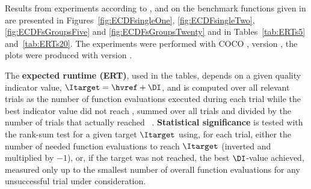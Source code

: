 \documentclass[sigconf]{acmart}
\begin{document}
Results from experiments according to \cite{hansen2016exp},
\cite{hansen2016perfass} and \cite{biobj2016perfass} on the benchmark
functions given in \cite{biobj2016func} are presented in
Figures~\ref{fig:ECDFsingleOne}, \ref{fig:ECDFsingleTwo}, \ref{fig:ECDFsGroupsFive} and
\ref{fig:ECDFsGroupsTwenty} and in Tables~\ref{tab:ERTs5} and~\ref{tab:ERTs20}.
The experiments were performed with COCO \cite{hansen2020cocoplat}, version
\change{\version}, the plots were produced with version \change{\version}.

The \textbf{expected runtime (ERT)}, used in the %
tables,
depends on a given quality indicator value, $\Itarget=\hvref+\DI$, and is
computed over all relevant trials as the number of function
evaluations executed during each trial while the best indicator value
did not reach \Itarget, summed over all trials and divided by the
number of trials that actually reached \Itarget\
\cite{hansen2016exp,price1997dev}.  \textbf{Statistical significance}
is tested with the rank-sum test for a given target $\Itarget$
using, for each trial,
either the number of needed function evaluations to reach
$\Itarget$ (inverted and multiplied by $-1$), or, if the target
was not reached, the best $\DI$-value achieved, measured only up to
the smallest number of overall function evaluations for any
unsuccessful trial under consideration.




\end{document}
